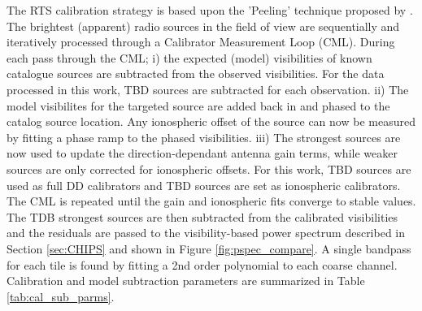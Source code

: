 \documentclass[preprint2]{aastex}
\begin{document}
The RTS calibration strategy is based upon the 'Peeling' technique proposed by \cite{Noordam:2004p2379}. The brightest (apparent) radio sources in the field of view are sequentially and iteratively processed through a Calibrator Measurement Loop (CML). During each pass through the CML; i) the expected (model) visibilities of known catalogue sources are subtracted from the observed visibilities. For the data processed in this work, TBD sources are subtracted for each observation. ii) The model visibilites for the targeted source are added back in and phased to the catalog source location. Any ionospheric offset of the source can now be measured by fitting a phase ramp to the phased visibilities. iii) The strongest sources are now used to update the direction-dependant antenna gain terms, while weaker sources are only corrected for ionospheric offsets. For this work, TBD sources are used as full DD calibrators and TBD sources are set as ionospheric calibrators. The CML is repeated until the gain and ionospheric fits converge to stable values. The TDB strongest sources are then subtracted from the calibrated visibilities and the residuals are passed to the visibility-based power spectrum described in Section \ref{sec:CHIPS} and shown in Figure \ref{fig:pspec_compare}.  A single bandpass for each tile is found by fitting a 2nd order polynomial to each coarse channel. Calibration and model subtraction parameters are summarized in Table \ref{tab:cal_sub_parms}. %
\end{document}
